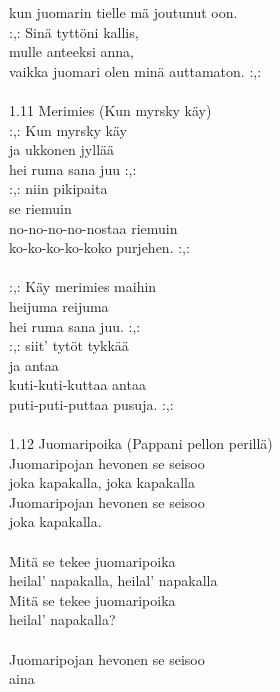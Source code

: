 kun juomarin tielle mä joutunut oon. \\ :,: Sinä tyttöni kallis, \\ mulle anteeksi anna, \\ vaikka juomari olen minä auttamaton. :,: \\ \hspace{10mm} \\ 1.11 Merimies (Kun myrsky käy) \\ :,: Kun myrsky käy \\ ja ukkonen jyllää \\ hei ruma sana juu :,: \\ :,: niin pikipaita \\ se riemuin \\ no-no-no-no-nostaa riemuin \\ ko-ko-ko-ko-koko purjehen. :,: \\ \hspace{10mm} \\ :,: Käy merimies maihin \\ heijuma reijuma \\ hei ruma sana juu. :,: \\ :,: siit' tytöt tykkää \\ ja antaa \\ kuti-kuti-kuttaa antaa \\ puti-puti-puttaa pusuja. :,: \\ \hspace{10mm} \\ 1.12 Juomaripoika (Pappani pellon perillä) \\ Juomaripojan hevonen se seisoo \\ joka kapakalla, joka kapakalla \\ Juomaripojan hevonen se seisoo \\ joka kapakalla. \\ \hspace{10mm} \\ Mitä se tekee juomaripoika \\ heilal' napakalla, heilal' napakalla \\ Mitä se tekee juomaripoika \\ heilal' napakalla? \\ \hspace{10mm} \\ Juomaripojan hevonen se seisoo \\ aina 
